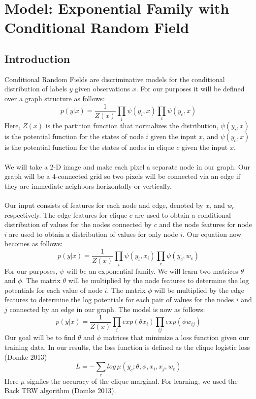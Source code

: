 


\section{Model: Exponential Family with Conditional Random Field}

\subsection{Introduction}

Conditional Random Fields are discriminative models for the conditional distribution of labels $y$ given observations $x$. For our purposes it will be defined over a graph structure as follows:
\[
p(y|x) = \frac{1}{Z(x)} \prod_i{\psi(y_i,x)} \prod_{c}{\psi(y_c,x)}
\]
Here, $Z(x)$ is the partition function that normalizes the distribution, $\psi(y_i,x)$ is the potential function for the states of node $i$ given the input $x$, and $\psi(y_c,x)$ is the potential function for the states of nodes in clique $c$ given the input $x$. \\
\\
We will take a 2-D image and make each pixel a separate node in our graph. Our graph will be a 4-connected grid so two pixels will be connected via an edge if they are immediate neighbors horizontally or vertically. \\
\\
Our input consists of features for each node and edge, denoted by $x_i$ and $w_c$ respectively. The edge features for clique $c$ are used to obtain a conditional distribution of values for the nodes connected by $c$ and the node features for node $i$ are used to obtain a distribution of values for only node $i$. Our equation now becomes as follows:
\[
p(y|x) = \frac{1}{Z(x)} \prod_i{\psi(y_i,x_i)} \prod_{c}{\psi(y_c,w_c)}
\]
For our purposes, $\psi$ will be an exponential family. We will learn two matrices $\theta$ and $\phi$. The matrix $\theta$ will be multiplied by the node features to determine the log potentials for each value of node $i$. The matrix $\phi$ will be multiplied by the edge features to determine the log potentials for each pair of values for the nodes $i$ and $j$ connected by an edge in our graph. The model is now as follows:
\[
p(y|x) = \frac{1}{Z(x)} \prod_i{exp(\theta x_i)} \prod_{ij}{exp(\phi w_{ij})}
\]
Our goal will be to find $\theta$ and $\phi$ matrices that minimize a loss function given our training data. In our results, the loss function is defined as the clique logistic loss (Domke 2013)
\[
L = - \sum_c {log \, \mu(y_c; \theta, \phi, x_i, x_j, w_c)}
\]
Here $\mu$ signfies the accuracy of the clique marginal. For learning, we used the Back TRW algorithm (Domke 2013).

